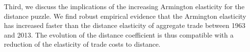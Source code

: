 \documentclass[12pt,twoside,a4paper,notitlepage]{article}
\begin{document}
Third, we discuss the implications of the increasing Armington elasticity for the distance puzzle. 
We find robust empirical evidence that the Armington elasticity has increased faster than the distance elasticity of aggregate trade between 1963 and 2013.
The evolution of the distance coefficient is thus compatible with a reduction of the elasticity of trade costs to distance.



\end{document}
